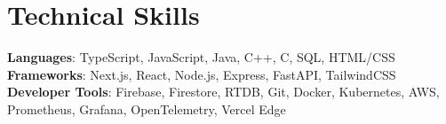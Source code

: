 \documentclass[letterpaper,10pt]{article}
\begin{document}
\section{Technical Skills}
 \begin{itemize}[leftmargin=0.12in, label={}, topsep=0pt]
    \small{\item{
     \textbf{Languages}{: TypeScript, JavaScript, Java, C++, C, SQL, HTML/CSS} \\
     \textbf{Frameworks}{: Next.js, React, Node.js, Express, FastAPI, TailwindCSS} \\
     \textbf{Developer Tools}{: Firebase, Firestore, RTDB, Git, Docker, Kubernetes, AWS, Prometheus, Grafana, OpenTelemetry, Vercel Edge}
    }}
 \end{itemize}
\end{document}
